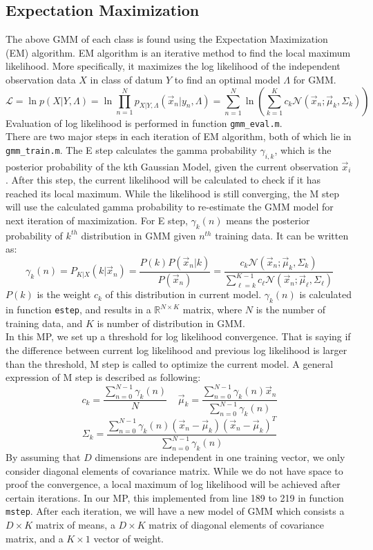\documentclass{article}
\begin{document}
	\subsection{Expectation Maximization}
	The above GMM of each class is found using the Expectation Maximization (EM) algorithm. EM algorithm is an iterative method to find the local maximum likelihood. More specifically, it maximizes the log likelihood of the independent observation data $X$ in class of datum $Y$ to find an optimal model $\Lambda$ for GMM.
	$${\mathcal L} = \ln p(X|Y,\Lambda)=\ln \prod_{n=1}^{N} p_{X|Y,\Lambda}(\vec{x}_n|y_n,\Lambda)=\sum_{n=1}^{N} \ln\left(\sum_{k=1}^{K}c_{k}{\mathcal N}(\vec{x}_n;\vec\mu_{k},\Sigma_{k})\right)$$
	Evaluation of log likelihood is performed in function \texttt{gmm\_eval.m}.\\ There are two major steps in each iteration of EM algorithm, both of which lie in \texttt{gmm\_train.m}. The E step calculates the gamma probability $\gamma_{i,k}$, which is the posterior probability of the kth Gaussian Model, given the current observation $\vec{x}_i$. After this step, the current likelihood will be calculated to check if it has reached its local maximum. While the likelihood is still converging, the M step will use the calculated gamma probability to re-estimate the GMM model for next iteration of maximization.
	For E step, $\gamma_k(n)$ means the posterior probability of $k^{th}$ distribution in GMM given $n^{th}$ training data. It can be written as:
	$$\gamma_k(n) = P_{K|X}(k|\vec{x}_n) = \frac{P(k)P(\vec{x}_n|k)}{P(\vec{x}_n)}=\frac{c_k{\mathcal N}(\vec{x}_n;\vec\mu_k,\Sigma_k)}{\sum_{\ell=k}^{K-1}c_\ell
		{\mathcal N}(\vec{x}_n;\vec\mu_{\ell},\Sigma_\ell)}$$
	$P(k)$ is the weight $c_k$ of this distribution in current model. $\gamma_k(n)$ is calculated in function \texttt{estep}, and results in a $\mathbb{R}^{N\times K}$ matrix, where $N$ is the number of training data, and $K$ is number of distribution in GMM. \\
	In this MP, we set up a threshold for log likelihood convergence. That is saying if the difference between current log likelihood and previous log likelihood is larger than the threshold, M step is called to optimize the current model. A general expression of M step is described as following:
	$$c_{k} = \frac{\sum_{n=0}^{N-1} \gamma_k(n)}{N} ~~~~~ \vec\mu_{k} = \frac{\sum_{n=0}^{N-1}\gamma_k(n)\vec{x}_n}{\sum_{n=0}^{N-1}\gamma_k(n)}$$
	$$\Sigma_{k} = \frac{\sum_{n=0}^{N-1}\gamma_k(n)(\vec{x}_n-\vec\mu_{k})(\vec{x}_n-\vec\mu_{k})^T}{\sum_{n=0}^{N-1}\gamma_k(n)}$$
	By assuming that $D$ dimensions are independent in one training vector, we only consider diagonal elements of covariance matrix. While we do not have space to proof the convergence, a local maximum of log likelihood will be achieved after certain iterations. In our MP, this implemented from line 189 to 219 in function \texttt{mstep}. After each iteration, we will have a new model of GMM which consists a $D\times K$ matrix of means, a $D\times K$ matrix of diagonal elements of covariance matrix, and a $K\times 1$ vector of weight. 
\end{document}
